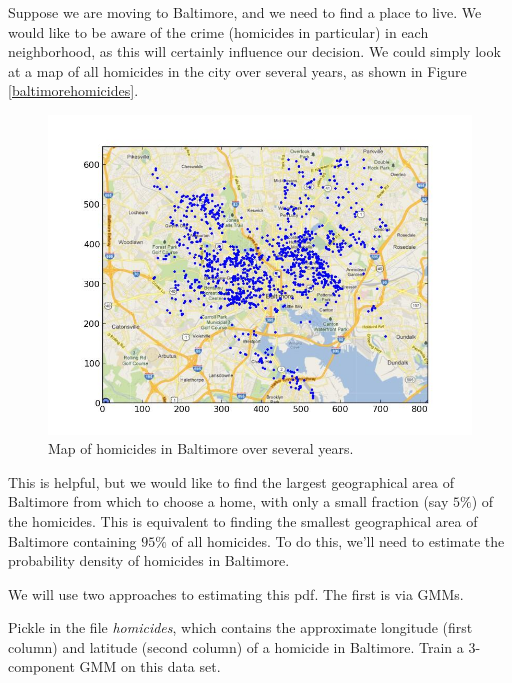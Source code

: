

Suppose we are moving to Baltimore, and we need to find a place to live. We would like to be aware of the crime (homicides in particular) in each neighborhood, as this will certainly influence our decision. We could simply look at a map of all homicides in the city over several years, as shown in Figure \ref{baltimorehomicides}.

\begin{figure}[h]
\centering
\includegraphics[width=\textwidth]{baltimorecrimemap.jpeg}
\caption{Map of homicides in Baltimore over several years.}
\end{figure}

This is helpful, but we would like to find the largest geographical area of Baltimore from which to choose a home, with only a small fraction (say $5\%$) of the homicides. This is equivalent to finding the smallest geographical area of Baltimore containing $95\%$ of all homicides. To do this, we'll need to estimate the probability density of homicides in Baltimore.

We will use two approaches to estimating this pdf. The first is via GMMs.

\begin{problem}
Pickle in the file \emph{homicides}, which contains the approximate longitude (first column) and latitude (second column) of a homicide in Baltimore. Train a $3$-component GMM on this data set.
\end{problem}


